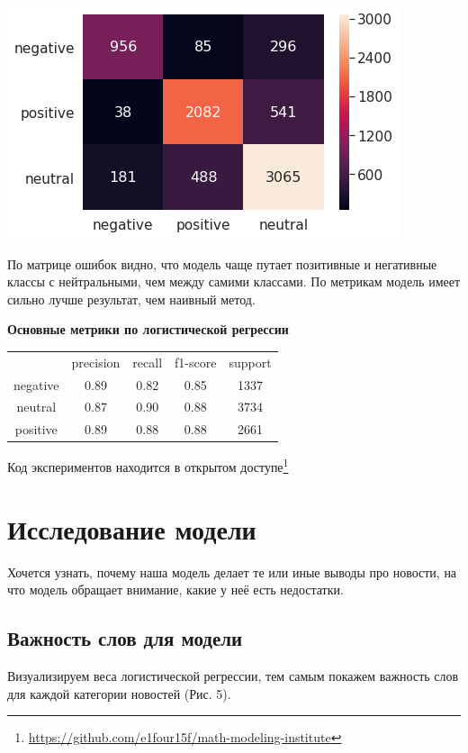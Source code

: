 \documentclass[12pt]{article}
\begin{document}
        \begin{center}
            \includegraphics[scale=0.8]{logreg_heat}
        \end{center}

        По матрице ошибок видно, что модель чаще путает позитивные и негативные классы с нейтральными, 
        чем между самими классами. По метрикам модель имеет сильно лучше результат, чем наивный метод.
        
        \textbf{Основные метрики по логистической регрессии}
        \begin{center}
            \begin{tabular}{ c c c c c}
             & precision & recall & f1-score & support\\ 
             negative & 0.89 & 0.82 & 0.85 & 1337\\ 
             neutral & 0.87 & 0.90 & 0.88 & 3734\\
             positive & 0.89 & 0.88 & 0.88 & 2661
            \end{tabular}
        \end{center}

        Код экспериментов находится в открытом доступе\footnote{\href{https://github.com/e1four15f/math-modeling-institute}{https://github.com/e1four15f/math-modeling-institute}}

    \section{Исследование модели}
        
        Хочется узнать, почему наша модель делает те или иные выводы про новости, на что модель обращает внимание,
        какие у неё есть недостатки.

        \subsection{Важность слов для модели}
            Визуализируем веса логистической регрессии, тем самым покажем важность слов для каждой категории новостей (Рис. 5).
\end{document}
